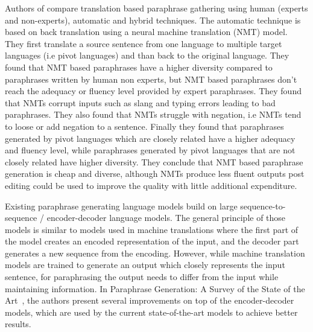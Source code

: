 \documentclass[fleqn,moreauthors,10pt]{ds_report}
\begin{document}
Authors of \cite{federmann-etal-2019-multilingual} compare translation based paraphrase gathering using human (experts and non-experts), automatic and hybrid techniques. The automatic technique is based on back translation using a neural machine translation (NMT) model. They first translate a source sentence from one language to multiple target languages (i.e pivot languages) and than back to the original language. They found that NMT based paraphrases have a higher diversity compared to paraphrases written by human non experts, but NMT based paraphrases don't reach the adequacy or fluency level provided by expert paraphrases. They found that NMTs corrupt inputs such as slang and typing errors leading to bad paraphrases. They also found that NMTs struggle with negation, i.e NMTs tend to loose or add negation to a sentence. Finally they found that paraphrases generated by pivot languages which are closely related have a higher adequacy and fluency level, while paraphrases generated by pivot languages that are not closely related have higher diversity. They conclude that NMT based paraphrase generation is cheap and diverse, although NMTs produce less fluent outputs post editing could be used to improve the quality with little additional expenditure.

Existing paraphrase generating language models build on large sequence-to-sequence / encoder-decoder language models. The general principle of those models is similar to models used in machine translations where the first part of the model creates an encoded representation of the input, and the decoder part generates a new sequence from the encoding. However, while machine translation models are trained to generate an output which closely represents the input sentence, for paraphrasing the output needs to differ from the input while maintaining information. In {Paraphrase Generation: A Survey of the State of the Art}~\cite{zhou-bhat-2021-paraphrase}, the authors present several improvements on top of the encoder-decoder models, which are used by the current state-of-the-art models to achieve better results. 
\end{document}
